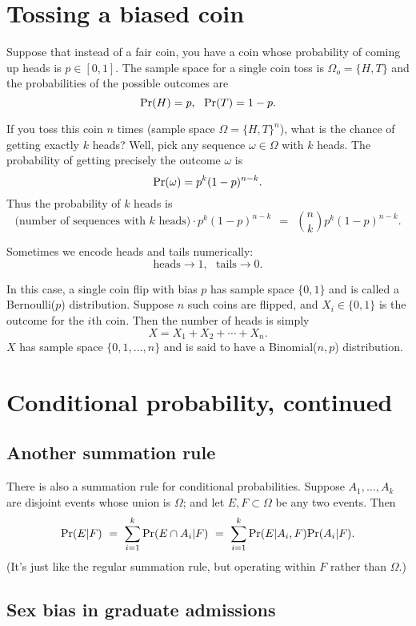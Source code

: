 \section{Tossing a biased coin}

Suppose that instead of a fair coin, you have a coin whose probability of coming up heads is $p \in [0,1]$. The sample space for a single coin toss is $\Omega_o = \{H,T\}$ and the probabilities of the possible outcomes are
$$ \mbox{\rm Pr}(H) = p, \ \ \mbox{\rm Pr}(T) = 1-p.$$

If you toss this coin $n$ times (sample space $\Omega = \{H,T\}^n$), what is the chance of getting exactly $k$ heads? Well, pick any sequence $\omega \in \Omega$ with $k$ heads. The probability of getting precisely the outcome $\omega$ is
$$ \mbox{\rm Pr}(\omega) = p^k (1-p)^{n-k} .$$
Thus the probability of $k$ heads is
$$ \mbox{(number of sequences with $k$ heads)} \cdot p^k (1-p)^{n-k} 
\ \ = \ \ 
{n \choose k} p^k (1-p)^{n-k} .$$

Sometimes we encode heads and tails numerically:
$$ \mbox{heads} \rightarrow 1, \ \ \ \mbox{tails} \rightarrow 0 .$$

In this case, a single coin flip with bias $p$ has sample space $\{0,1\}$ and is called a Bernoulli($p$) distribution. Suppose $n$ such coins are flipped, and $X_i \in \{0,1\}$ is the outcome for the $i$th coin. Then the number of heads is simply 
$$ X = X_1 + X_2 + \cdots + X_n. $$
$X$ has sample space $\{0,1,\ldots,n\}$ and is said to have a Binomial($n,p$) distribution.

\section{Conditional probability, continued}

\subsection{Another summation rule}

There is also a summation rule for conditional probabilities. Suppose $A_1, \ldots, A_k$ are disjoint events whose union is $\Omega$; and let $E,F \subset \Omega$ be any two events. Then
$$ \pr(E | F) 
\ = \ 
\sum_{i=1}^k \pr(E \cap A_i | F) 
\ = \ 
\sum_{i=1}^k \pr(E | A_i, F) \pr(A_i|F).
$$
(It's just like the regular summation rule, but operating within $F$ rather than $\Omega$.)

\subsection{Sex bias in graduate admissions}


